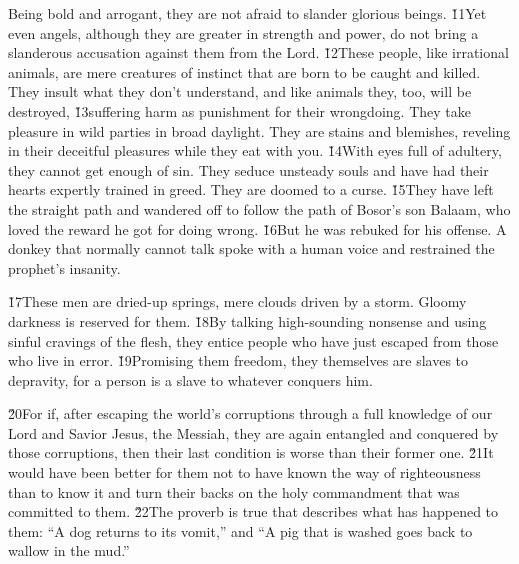 Being bold and arrogant, they are not afraid to slander glorious beings. \v{11}Yet even angels, although they are greater in strength and power, do not bring a slanderous accusation against them from the Lord. \v{12}These people, like irrational animals, are mere creatures of instinct that are born to be caught and killed. They insult what they don't understand, and like animals they, too, will be destroyed, \v{13}suffering harm as punishment for their wrongdoing. They take pleasure in wild parties in broad daylight. They are stains and blemishes, reveling in their deceitful pleasures while they eat with you. \v{14}With eyes full of adultery, they cannot get enough of sin. They seduce unsteady souls and have had their hearts expertly trained in greed. They are doomed to a curse. \v{15}They have left the straight path and wandered off to follow the path of Bosor's son Balaam, who loved the reward he got for doing wrong. \v{16}But he was rebuked for his offense. A donkey that normally cannot talk spoke with a human voice and restrained the prophet's insanity.

\v{17}These men are dried-up springs, mere clouds driven by a storm. Gloomy darkness is reserved for them. \v{18}By talking high-sounding nonsense and using sinful cravings of the flesh, they entice people who have just escaped from those who live in error. \v{19}Promising them freedom, they themselves are slaves to depravity, for a person is a slave to whatever conquers him.

\v{20}For if, after escaping the world's corruptions through a full knowledge of our Lord and Savior Jesus, the Messiah, they are again entangled and conquered by those corruptions, then their last condition is worse than their former one. \v{21}It would have been better for them not to have known the way of righteousness than to know it and turn their backs on the holy commandment that was committed to them. \v{22}The proverb is true that describes what has happened to them: ``A dog returns to its vomit,'' and ``A pig that is washed goes back to wallow in the mud.''

